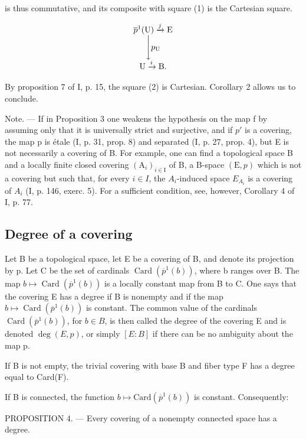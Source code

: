 is thus commutative, and its composite with square (1) is the Cartesian square.

\[
\begin{array}{c} \overline {{p}} ^ {1} (\mathrm{U}) \xrightarrow {j} \mathrm{E} \\ \Biggl \downarrow p _ {\mathrm{U}} \\ \mathrm{U} \xrightarrow {i} \mathrm{B}. \end{array}
\]

By proposition 7 of I, p. 15, the square (2) is Cartesian. Corollary 2 allows us to conclude.

Note. --- If in Proposition 3 one weakens the hypothesis on the map f by assuming only that it is universally strict and surjective, and if \(p'\) is a covering, the map p is étale (I, p. 31, prop. 8) and separated (I, p. 27, prop. 4), but E is not necessarily a covering of B. For example, one can find a topological space B and a locally finite closed covering \((\mathrm{A}_{i})_{i\in\mathrm{I}}\) of B, a B-space \((\mathrm{E},p)\) which is not a covering but such that, for every \(i\in I\), the \(A_{i}\)-induced space \(E_{A_{i}}\) is a covering of \(A_{i}\) (I, p. 146, exerc. 5). For a sufficient condition, see, however, Corollary 4 of I, p. 77.

\subsection{Degree of a covering}

Let B be a topological space, let E be a covering of B, and denote its projection by p. Let C be the set of cardinals \(\operatorname{Card}(\overline{p}^{1}(b))\), where b ranges over B. The map \(b \mapsto \operatorname{Card}(\overline{p}^{1}(b))\) is a locally constant map from B to C. One says that the covering E has a degree if B is nonempty and if the map \(b \mapsto \operatorname{Card}(\overline{p}^{1}(b))\) is constant. The common value of the cardinals \(\operatorname{Card}(\overline{p}^{1}(b))\), for \(b \in B\), is then called the degree of the covering E and is denoted \(\deg(E, p)\), or simply \([E:B]\) if there can be no ambiguity about the map p.

If B is not empty, the trivial covering with base B and fiber type F has a degree equal to Card(F).

If B is connected, the function \(b \mapsto \text{Card}(\overline{p}^{1}(b))\) is constant. Consequently:

PROPOSITION 4. --- Every covering of a nonempty connected space has a degree.

